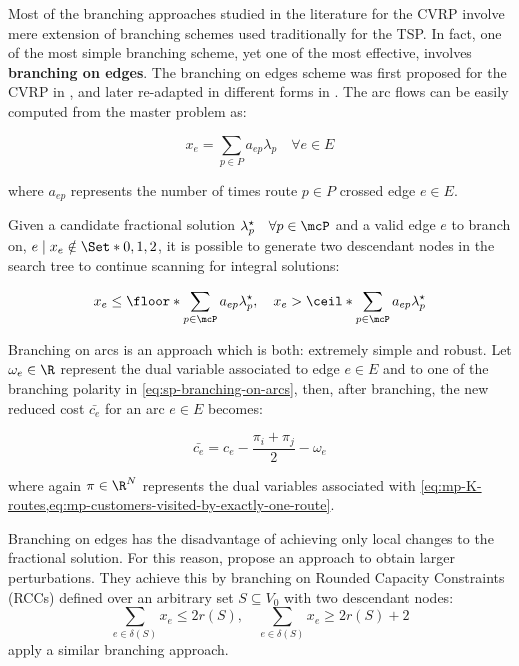 Most of the branching approaches studied in the literature for the CVRP involve
mere extension of branching schemes used traditionally for the TSP.
In fact, one of the most simple branching scheme,
yet one of the most effective,
involves \textbf{branching on edges}.
The branching on edges scheme was first proposed for the CVRP in \textcite{christofides1969a},
and later re-adapted in different forms in \textcite{fisher1994a, miller1995}.
The arc flows can be easily computed from the master problem as:

\begin{equation}
	x_e = \sum_{p \in P} a_{ep} \lambda_p  \quad \forall e \in E
\end{equation}

where $a_{ep}$ represents the number of times route $p \in P$ crossed edge $e \in E$.

Given a candidate fractional solution $\lambda^\star_p \quad \forall p \in \mcP$
and a valid edge $e$ to branch on, $e \mid x_e \notin \Set*{0, 1, 2}$,
it is possible to generate two descendant nodes in the search tree
to continue scanning for integral solutions:

\begin{equation}\label{eq:sp-branching-on-arcs}
	x_e \le \floor*{\sum_{p \in \mcP} a_{ep} \lambda^\star_p}, \quad
	x_e > \ceil*{\sum_{p \in \mcP} a_{ep} \lambda^\star_p}
\end{equation}

Branching on arcs is an approach which is both: extremely simple and robust.
Let $\omega_e \in \R$ represent the dual variable associated to
edge $e \in E$ and to
one of the branching polarity in \cref{eq:sp-branching-on-arcs},
then, after branching,
the new reduced cost $\bar{c_e}$ for an arc $e \in E$ becomes:

\begin{equation}
	\bar{c_e} = c_e - \frac{\pi_i + \pi_j}{2} - \omega_e
\end{equation}

where again $\pi \in \R^N$ represents the dual variables associated with \cref{eq:mp-K-routes,eq:mp-customers-visited-by-exactly-one-route}.

Branching on edges has the disadvantage of achieving only local changes
to the fractional solution.
For this reason, \textcite{augerat1998} propose an
approach to obtain larger perturbations.
They achieve this by branching on Rounded Capacity Constraints (RCCs) defined over
an arbitrary set $S \subseteq V_0$ with two descendant nodes:
\begin{equation}\label{eq:sp-branching-on-cutsets}
	\sum_{e \in \delta(S)}x_e \le 2 r(S), \quad
	\sum_{e \in \delta(S)}x_e \ge 2 r(S) + 2
\end{equation}
\textcite{pecin2017} apply a similar branching approach.



